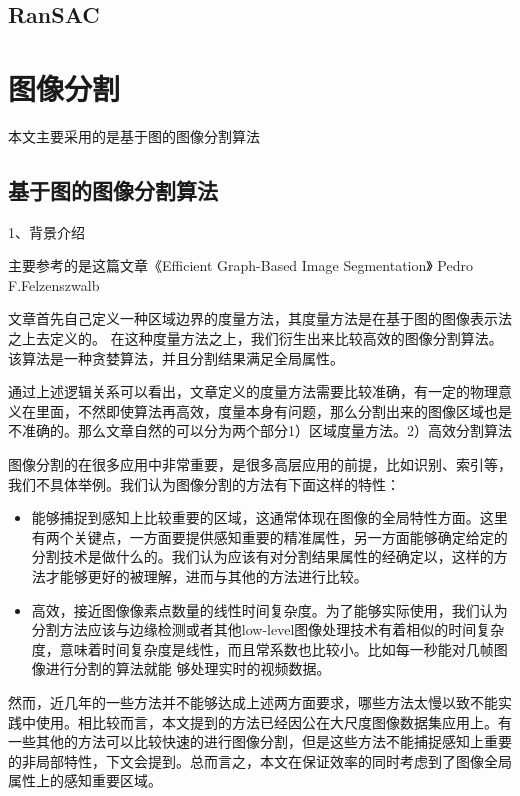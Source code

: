 \subsection{RanSAC}

\section{图像分割}

本文主要采用的是基于图的图像分割算法

\subsection{基于图的图像分割算法}

1、背景介绍

主要参考的是这篇文章《Efficient Graph-Based Image Segmentation》 Pedro F.Felzenszwalb

文章首先自己定义一种区域边界的度量方法，其度量方法是在基于图的图像表示法之上去定义的。
在这种度量方法之上，我们衍生出来比较高效的图像分割算法。该算法是一种贪婪算法，并且分割结果满足全局属性。

通过上述逻辑关系可以看出，文章定义的度量方法需要比较准确，有一定的物理意义在里面，不然即使算法再高效，度量本身有问题，那么分割出来的图像区域也是不准确的。那么文章自然的可以分为两个部分1）区域度量方法。2）高效分割算法

图像分割的在很多应用中非常重要，是很多高层应用的前提，比如识别、索引等，我们不具体举例。我们认为图像分割的方法有下面这样的特性：
\begin{itemize}
\item 能够捕捉到感知上比较重要的区域，这通常体现在图像的全局特性方面。这里有两个关键点，一方面要提供感知重要的精准属性，另一方面能够确定给定的分割技术是做什么的。我们认为应该有对分割结果属性的经确定以，这样的方法才能够更好的被理解，进而与其他的方法进行比较。
\item 高效，接近图像像素点数量的线性时间复杂度。为了能够实际使用，我们认为分割方法应该与边缘检测或者其他low-level图像处理技术有着相似的时间复杂度，意味着时间复杂度是线性，而且常系数也比较小。比如每一秒能对几帧图像进行分割的算法就能
够处理实时的视频数据。
\end{itemize}

然而，近几年的一些方法并不能够达成上述两方面要求，哪些方法太慢以致不能实践中使用。相比较而言，本文提到的方法已经因公在大尺度图像数据集应用上。有一些其他的方法可以比较快速的进行图像分割，但是这些方法不能捕捉感知上重要的非局部特性，下文会提到。总而言之，本文在保证效率的同时考虑到了图像全局属性上的感知重要区域。

